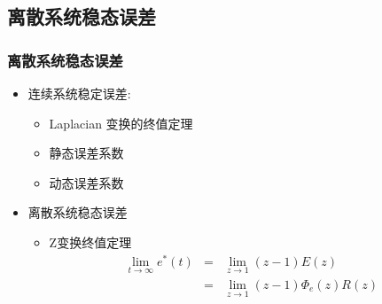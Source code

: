 \documentclass[table]{beamer}
\begin{document}
\subsection{离散系统稳态误差}
\label{sec-6-1}
\begin{frame}
\frametitle{离散系统稳态误差}
\label{sec-6-1-1}

\begin{itemize}
\item 连续系统稳定误差:
\begin{itemize}
\item Laplacian 变换的终值定理
\item 静态误差系数
\item 动态误差系数
\end{itemize}
\item <2->离散系统稳态误差
\begin{itemize}
\item Z变换终值定理
      \begin{eqnarray*}
      \lim_{t\rightarrow\infty}e^*(t) & = &\lim_{z\rightarrow 1}(z-1)E(z)\\
       &=& \lim_{z\rightarrow 1}(z-1)\Phi_e(z)R(z)
      \end{eqnarray*}
\end{itemize}
\end{itemize}
\end{frame}
\end{document}
